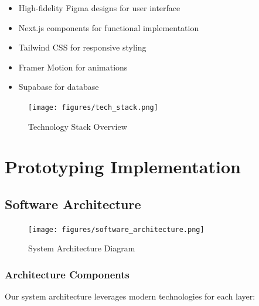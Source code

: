 \begin{itemize}
    \item High-fidelity Figma designs for user interface
    \item Next.js components for functional implementation
    \item Tailwind CSS for responsive styling
    \item Framer Motion for animations
    \item Supabase for database
\end{itemize}

\begin{figure}[H]
    \centering
    \texttt{[image: figures/tech\_stack.png]}
    \caption{Technology Stack Overview}
\end{figure}

\section{Prototyping Implementation}
\subsection{Software Architecture}

\begin{figure}[H]
    \centering
    \texttt{[image: figures/software\_architecture.png]}
    \caption{System Architecture Diagram}
\end{figure}

\subsubsection{Architecture Components}
Our system architecture leverages modern technologies for each layer:

